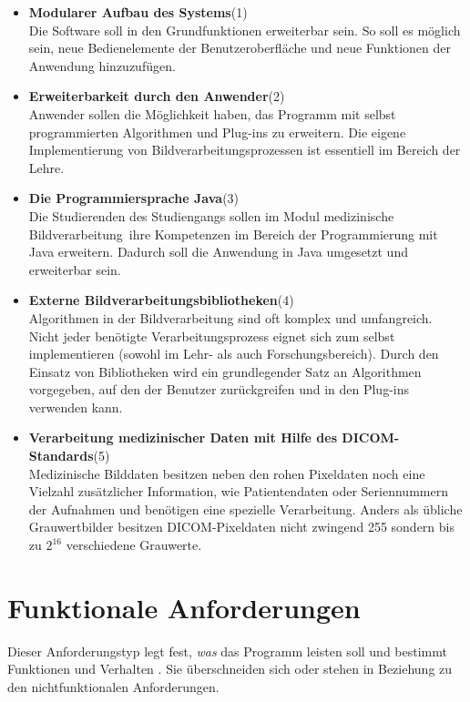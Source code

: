 \begin{itemize}
\item  \textbf{Modularer Aufbau des Systems}(1)\\
	  Die Software soll in den Grundfunktionen erweiterbar sein. So soll es möglich sein, neue Bedienelemente der Benutzeroberfläche und neue Funktionen der Anwendung hinzuzufügen.
	  
\item \textbf{Erweiterbarkeit durch den Anwender}(2)\\
	Anwender sollen die Möglichkeit haben, das Programm mit selbst programmierten Algorithmen und Plug-ins zu erweitern. Die eigene Implementierung von Bildverarbeitungsprozessen ist essentiell im Bereich der Lehre.
	
\item \textbf{Die Programmiersprache Java}(3)\\
	Die Studierenden des Studiengangs sollen im Modul \glqq medizinische Bildverarbeitung\grqq\ ihre Kompetenzen im Bereich der Programmierung mit Java erweitern. Dadurch soll die Anwendung in Java umgesetzt und erweiterbar sein.
	
\item \textbf{Externe Bildverarbeitungsbibliotheken}(4)\\
	Algorithmen in der Bildverarbeitung sind oft komplex und umfangreich. Nicht jeder benötigte Verarbeitungsprozess eignet sich zum selbst implementieren (sowohl im Lehr- als auch Forschungsbereich). Durch den Einsatz von Bibliotheken wird ein grundlegender Satz an Algorithmen vorgegeben, auf den der Benutzer zurückgreifen und in den Plug-ins verwenden kann.
	
\item \textbf{Verarbeitung medizinischer Daten mit Hilfe des DICOM-Standards}(5)\\
	Medizinische Bilddaten besitzen neben den rohen Pixeldaten noch eine Vielzahl zusätzlicher Information, wie Patientendaten oder Seriennummern der Aufnahmen und benötigen eine spezielle Verarbeitung. Anders als übliche Grauwertbilder besitzen DICOM-Pixeldaten nicht zwingend 255 sondern bis zu $2^{16}$ verschiedene Grauwerte.
\end{itemize}

\section{Funktionale Anforderungen}

Dieser Anforderungstyp legt fest, \textit{was} das Programm leisten soll und bestimmt Funktionen und Verhalten \cite[9]{balzert:swa}. Sie überschneiden sich oder stehen in Beziehung zu den nichtfunktionalen Anforderungen.

